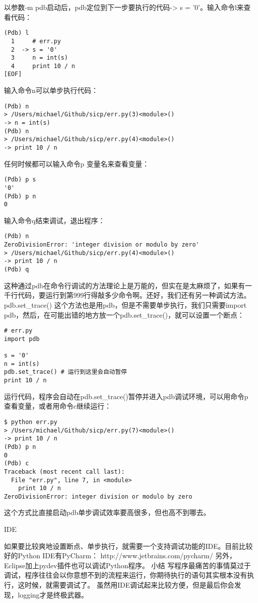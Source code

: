 \documentclass[twoside,11pt]{book}
\begin{document}
以参数-m pdb启动后，pdb定位到下一步要执行的代码-> s = '0'。输入命令l来查看代码：
\begin{lstlisting}
(Pdb) l
  1     # err.py
  2  -> s = '0'
  3     n = int(s)
  4     print 10 / n
[EOF]
\end{lstlisting}

输入命令n可以单步执行代码：
\begin{lstlisting}
(Pdb) n
> /Users/michael/Github/sicp/err.py(3)<module>()
-> n = int(s)
(Pdb) n
> /Users/michael/Github/sicp/err.py(4)<module>()
-> print 10 / n
\end{lstlisting}

任何时候都可以输入命令p 变量名来查看变量：
\begin{lstlisting}
(Pdb) p s
'0'
(Pdb) p n
0
\end{lstlisting}

输入命令q结束调试，退出程序：
\begin{lstlisting}
(Pdb) n
ZeroDivisionError: 'integer division or modulo by zero'
> /Users/michael/Github/sicp/err.py(4)<module>()
-> print 10 / n
(Pdb) q
\end{lstlisting}

这种通过pdb在命令行调试的方法理论上是万能的，但实在是太麻烦了，如果有一千行代码，要运行到第999行得敲多少命令啊。还好，我们还有另一种调试方法。
pdb.set\_trace()
这个方法也是用pdb，但是不需要单步执行，我们只需要import pdb，然后，在可能出错的地方放一个pdb.set\_trace()，就可以设置一个断点：
\begin{lstlisting}
# err.py
import pdb

s = '0'
n = int(s)
pdb.set_trace() # 运行到这里会自动暂停
print 10 / n
\end{lstlisting}

运行代码，程序会自动在pdb.set\_trace()暂停并进入pdb调试环境，可以用命令p查看变量，或者用命令c继续运行：
\begin{lstlisting}
$ python err.py
> /Users/michael/Github/sicp/err.py(7)<module>()
-> print 10 / n
(Pdb) p n
0
(Pdb) c
Traceback (most recent call last):
  File "err.py", line 7, in <module>
    print 10 / n
ZeroDivisionError: integer division or modulo by zero
\end{lstlisting}

这个方式比直接启动pdb单步调试效率要高很多，但也高不到哪去。

IDE

如果要比较爽地设置断点、单步执行，就需要一个支持调试功能的IDE。目前比较好的Python IDE有PyCharm：
http://www.jetbrains.com/pycharm/
另外，Eclipse加上pydev插件也可以调试Python程序。
小结
写程序最痛苦的事情莫过于调试，程序往往会以你意想不到的流程来运行，你期待执行的语句其实根本没有执行，这时候，就需要调试了。
虽然用IDE调试起来比较方便，但是最后你会发现，logging才是终极武器。
\end{document}
